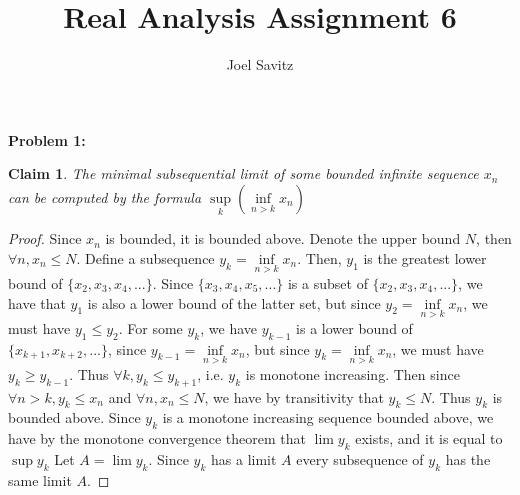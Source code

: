 \documentclass{article}
\title{Real Analysis Assignment 6}
\author{Joel Savitz}
\newtheorem{clm}{Claim}
\begin{document}
\maketitle

\textbf{Problem 1:}

\begin{clm}
	The minimal subsequential limit of some bounded infinite sequence $x_n$
	can be computed by the formula
	$\underset{k}{\sup}(\underset{n > k}{\inf} x_n)$
\end{clm}

\begin{proof}
	Since $x_n$ is bounded, it is bounded above.
	Denote the upper bound $N$, then $\forall n, x_n \le N$.
	Define a subsequence $y_k = \underset{n > k}{\inf} x_n$.
	Then, $y_1$ is the greatest lower bound of $\{ x_2, x_3, x_4, ... \}$.
	Since $\{ x_3, x_4, x_5, ... \}$ is a subset of $\{ x_2, x_3, x_4, ... \}$,
	we have that $y_1$ is also a lower bound of the latter set,
	but since $y_2 = \underset{n > k}{\inf} x_n$,
	we must have $y_1 \le y_2$.
	For some $y_k$,
	we have $y_{k-1}$ is a lower bound of $\{ x_{k + 1}, x_{k+2}, ...\}$,
	since $y_{k - 1} = \underset{n > k}{\inf} x_n$,
	but since $y_k = \underset{n > k}{\inf} x_n$,
	we must have $y_k \ge y_{k - 1}$.
	Thus $\forall k, y_k \le y_{k + 1}$, i.e. $y_k$ is monotone increasing.
	Then since $\forall n > k, y_k \le x_n$ and $\forall n, x_n \le N$,
	we have by transitivity that $y_k \le N$.
	Thus $y_k$ is bounded above.
	Since $y_k$ is a monotone increasing sequence bounded above,
	we have by the monotone convergence theorem that $\lim y_k$ exists,
	and it is equal to $\sup y_k$
	Let $A = \lim y_k$.
	Since $y_k$ has a limit $A$
	every subsequence of $y_k$ has the same limit $A$.


\end{proof}
\end{document}
